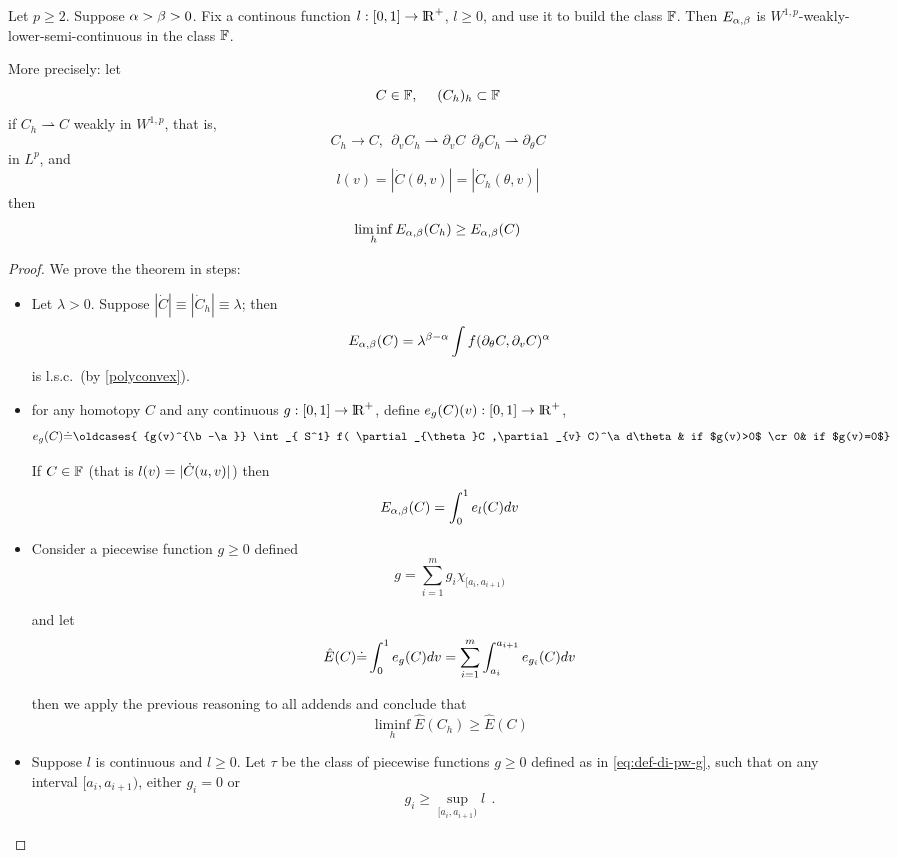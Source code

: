 \documentclass[twoside,a4paper,english]{article}
\def\derpar#1{\partial_{#1}}
\def\wto{\rightharpoonup}
\begin{document}
\begin{Proposition}\label{lsc}
  Let $p\ge 2$.
    Suppose $\alpha> \beta>0$.
    Fix a continous function $l:[0,1]\to{\protect\mathrm{l\hskip-0.15em R}}^+$, $l\ge 0$, and use it to
    build the class ${\mathbb F}$.  
    Then $E_{\alpha,\beta}$ is $W^{1,p}$-weakly-lower-semi-continuous in the class
    ${\mathbb F}$. 

    More precisely: let
    \[ C\in {\mathbb F}, ~~~~ (C_h)_h\subset {\mathbb F}  \]
    if  $ C_h\wto C$ weakly in $W^{1,p}$, that is,
    \[ C_h\to C, ~~\derpar v C_h \wto  \derpar v C ~~
    \derpar \theta C_h \wto  \derpar \theta C   \]
    in $L^p$,  and 
    \[ l(v) =  |\dot C(\theta,v)| = |\dot C_h(\theta,v)|   \]
    then     
    \[ \liminf_h E_{\alpha,\beta} (C_h) \ge E_{\alpha,\beta}(C) \]
\end{Proposition}
\begin{proof}
  We prove %
  the theorem in steps:
  \begin{itemize}
  \item 
      Let $\lambda>0$.
      Suppose  %
      $|\dot C|\equiv |\dot C_h|\equiv \lambda$; then 
      \[ E_{\a,\b}(C)= \lambda^{\b-\a} \int f(\derpar \theta C,\derpar v C)^\a \]
      is l.s.c.\ (by \ref{polyconvex}).

    \item
      for any homotopy $C$ and any continuous $g:[0,1]\to{\protect\mathrm{l\hskip-0.15em R}}^+$,
      define $e_g(C)(v):[0,1]\to {\protect\mathrm{l\hskip-0.15em R}}^+$,
      \[ e_g(C)\defeq \oldcases{ 
         {g(v)^{\b-\a}}
        \int_{ S^1}     f(  \derpar \theta C  ,\derpar v C)^\a d\theta
        & if $g(v)>0$ \cr
        0& if $g(v)=0$} \]
      
      If $C\in {\mathbb F}$ (that is   $l(v)=|\dot C(u,v)|$)  then
      \[ E_{\alpha,\beta}(C)    =  \int_0^1  e_l(C) dv\]

    \item 
      Consider a piecewise function  $g\ge 0$ defined 
      \begin{equation}
        g=\sum_{i=1}^m  g_i \chi_{[a_i,a_{i+1})}\label{eq:def-di-pw-g}        
      \end{equation}
        

      and let 
      \[ \hat E(C) {\stackrel{\mbox{.}}{=}}   \int_0^1  e_{g}(C) dv =
      \sum _{i=1}^m       \int_{a_i}^{a_{i+1}}      e_{g_i}(C) d v  \]

      then we apply the previous  reasoning to all addends
      and conclude that 
      \[      \liminf_h \hat E(C_h) \ge  \hat E(C)\]

    \item 
      Suppose $l$ is continuous and $l\ge 0$.
      Let $\tau$ be the class of piecewise functions  $g\ge 0$ defined 
      as in \eqref{eq:def-di-pw-g},
      such that on any interval $[a_i,a_{i+1})$, either 
      $ g_i=0$ or 
      \[ g_i\ge \sup_{[a_i,a_{i+1})} l ~~.\]


\end{itemize}
\end{proof}
\end{document}
